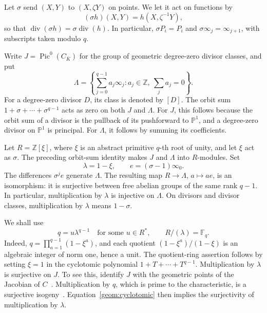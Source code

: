 Let $\sigma$ send $(X,Y)$ to $(X,\zeta Y)$ on points.
We let it act on functions by
\begin{equation}
                 (\sigma h)(X,Y)=h(X,\zeta^{-1}Y),
\label{geom:function-action}
\end{equation}
so that $\operatorname{div}(\sigma h)=\sigma\operatorname{div}(h)$.
In particular, $\sigma P_i=P_i$ and
$\sigma\infty_j=\infty_{j+1}$, with subscripts taken modulo $q$.

Write $J=\operatorname{Pic}^0(C_{\overline K})$ for the group of
geometric degree-zero divisor classes, and put
\[
 \Lambda=\left\{\sum_{j=0}^{q-1}a_j\infty_j:
                  a_j\in\mathbb Z,\ \sum_j a_j=0\right\}.
\]
For a degree-zero divisor $D$, its class is denoted by $[D]$.
The orbit sum $1+\sigma+\cdots+\sigma^{q-1}$ acts as zero on both $J$
and $\Lambda$.  For $J$, this follows because the orbit sum of a divisor
is the pullback of its pushforward to $\mathbb P^1$, and a degree-zero
divisor on $\mathbb P^1$ is principal.  For $\Lambda$, it follows by
summing its coefficients.

Let $R=\mathbb Z[\xi]$, where $\xi$ is an abstract primitive $q$-th root
of unity, and let $\xi$ act as $\sigma$.  The preceding orbit-sum identity
makes $J$ and $\Lambda$ into $R$-modules.  Set
\begin{equation}
             \lambda=1-\xi,\qquad e=(\sigma-1)\infty_0.
\label{geom:lambda}
\end{equation}
The differences $\sigma^j e$ generate $\Lambda$.  The resulting map
$R\longrightarrow\Lambda$, $a\longmapsto ae$, is an isomorphism:
it is surjective between free abelian groups of the same rank $q-1$.
In particular, multiplication by $\lambda$ is injective on $\Lambda$.
On divisors and divisor classes, multiplication by $\lambda$ means
$1-\sigma$.

We shall use
\begin{equation}
          q=u\lambda^{q-1}\quad\text{for some }u\in R^*,
          \qquad R/(\lambda)=\mathbb F_q.
\label{geom:cyclotomic}
\end{equation}
Indeed, $q=\prod_{a=1}^{q-1}(1-\xi^a)$, and each quotient
$(1-\xi^a)/(1-\xi)$ is an algebraic integer of norm one, hence a unit.
The quotient-ring assertion follows by setting $\xi=1$ in the
cyclotomic polynomial $1+T+\cdots+T^{q-1}$.
Multiplication by $\lambda$ is surjective on $J$.
To see this, identify $J$ with the geometric points of the Jacobian of
$C$~\cite[Theorem 1.1]{MilneJV86}.  Multiplication by $q$, which is prime
to the characteristic, is a surjective
isogeny~\cite[Theorem 8.2]{MilneAV86}.
Equation~\eqref{geom:cyclotomic} then implies the
surjectivity of multiplication by $\lambda$.

